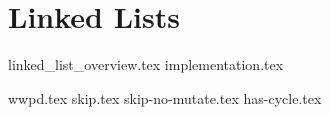 \documentclass{exam}
\begin{document}
\newpage
\section{Linked Lists}
{linked_list_overview.tex}
{implementation.tex}

\begin{questions}
	{wwpd.tex}
	{skip.tex}
	{skip-no-mutate.tex}
	{has-cycle.tex}
\end{questions}
\end{document}
